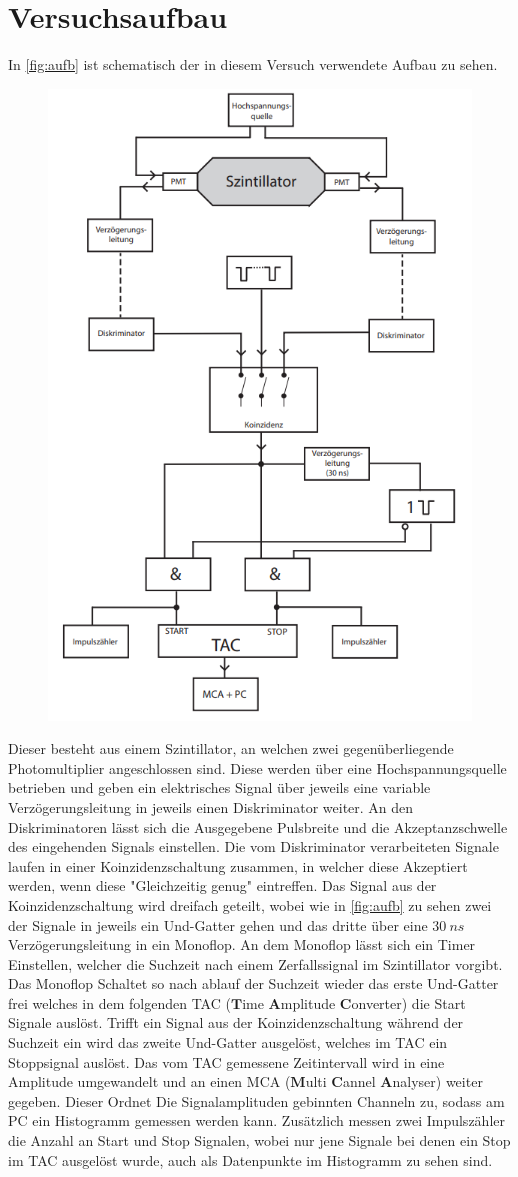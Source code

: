 \section{Versuchsaufbau}
In \autoref{fig:aufb} ist schematisch der in diesem Versuch verwendete Aufbau zu sehen.
\begin{figure}[H]
    \centering
    \includegraphics[width=0.5\linewidth]{data/aufbau_schem.png}
    \label{fig:aufb}
\end{figure}
\noindent
Dieser besteht aus einem Szintillator, an welchen zwei gegenüberliegende Photomultiplier angeschlossen sind. Diese werden über eine Hochspannungsquelle betrieben und geben ein 
elektrisches Signal über jeweils eine variable Verzögerungsleitung in jeweils einen Diskriminator weiter. An den Diskriminatoren lässt sich die Ausgegebene Pulsbreite und die Akzeptanzschwelle des eingehenden Signals einstellen.
Die vom Diskriminator verarbeiteten Signale laufen in einer Koinzidenzschaltung zusammen, in welcher diese Akzeptiert werden, wenn diese "Gleichzeitig genug" eintreffen. Das Signal aus der Koinzidenzschaltung wird dreifach geteilt, wobei wie in \autoref{fig:aufb} zu sehen zwei der Signale in jeweils 
ein Und-Gatter gehen und das dritte über eine $\SI{30}{ns}$ Verzögerungsleitung in ein Monoflop. An dem Monoflop lässt sich ein Timer Einstellen, welcher die Suchzeit nach einem Zerfallssignal im Szintillator vorgibt. Das Monoflop Schaltet so nach ablauf der Suchzeit wieder das erste Und-Gatter frei welches in dem folgenden TAC ($\textbf{T}$ime $\textbf{A}$mplitude $\textbf{C}$onverter)
die Start Signale auslöst. Trifft ein Signal aus der Koinzidenzschaltung während der Suchzeit ein wird das zweite Und-Gatter ausgelöst, welches im TAC ein Stoppsignal auslöst. Das vom TAC gemessene Zeitintervall wird in eine Amplitude umgewandelt und an einen MCA ($\textbf{M}$ulti $\textbf{C}$annel $\textbf{A}$nalyser) weiter gegeben. Dieser Ordnet Die Signalamplituden gebinnten Channeln zu, sodass am PC ein Histogramm gemessen werden kann.
Zusätzlich messen zwei Impulszähler die Anzahl an Start und Stop Signalen, wobei nur jene Signale bei denen ein Stop im TAC ausgelöst wurde, auch als Datenpunkte im Histogramm zu sehen sind.
\newpage
